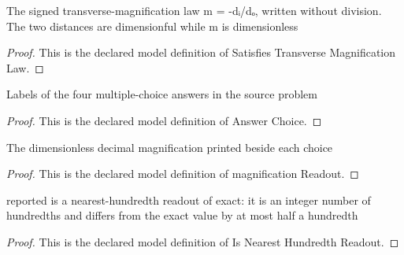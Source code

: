 \begin{definition}
  \label{def:physics:phyx-mini-0139:phyxminiproblems-problemphyxmini0139-satisfiestransversemagnificationlaw}
  The signed transverse-magnification law m = -dᵢ/dₒ, written without division. The two distances are dimensionful while m is dimensionless
\end{definition}
\begin{proof}
  This is the declared model definition of Satisfies Transverse Magnification Law.
\end{proof}
\begin{definition}
  \label{def:physics:phyx-mini-0139:phyxminiproblems-problemphyxmini0139-answerchoice}
  Labels of the four multiple-choice answers in the source problem
\end{definition}
\begin{proof}
  This is the declared model definition of Answer Choice.
\end{proof}
\begin{definition}
  \label{def:physics:phyx-mini-0139:phyxminiproblems-problemphyxmini0139-answerchoice-magnificationreadout}
  The dimensionless decimal magnification printed beside each choice
\end{definition}
\begin{proof}
  This is the declared model definition of magnification Readout.
\end{proof}
\begin{definition}
  \label{def:physics:phyx-mini-0139:phyxminiproblems-problemphyxmini0139-isnearesthundredthreadout}
  reported is a nearest-hundredth readout of exact: it is an integer number of hundredths and differs from the exact value by at most half a hundredth
\end{definition}
\begin{proof}
  This is the declared model definition of Is Nearest Hundredth Readout.
\end{proof}
